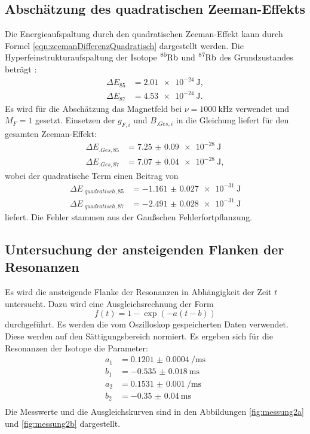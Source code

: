 \newpage
\subsection{Abschätzung des quadratischen Zeeman-Effekts}

Die Energieaufspaltung durch den quadratischen Zeeman-Effekt kann durch Formel \eqref{eqn:zeemanDifferenzQuadratisch} dargestellt werden. Die Hyperfeinstrukturaufspaltung der Isotope $\ce{^{85}Rb}$ und $\ce{^{87}Rb}$ des Grundzustandes beträgt \cite{V21}:
\begin{align*}
\Delta E_{85} &= \SI{2.01e-24}{\joule},\\
\Delta E_{87} &= \SI{4.53e-24}{\joule}\text{.}
\end{align*}
Es wird für die Abschätzung das Magnetfeld bei $\nu=\SI{1000}{\kilo\hertz}$ verwendet und $M_F=1$ gesetzt. Einsetzen der $g_{F,i}$ und $B_{.{Ges},i}$ in die Gleichung liefert für den gesamten Zeeman-Effekt:
\begin{align*}
\Delta E_{.{Ges},85} &= \SI{7.25(9)e-28}{\joule}\\
\Delta E_{.{Ges},87} &= \SI{7.07(4)e-28}{\joule},
\end{align*}
wobei der quadratische Term einen Beitrag von
\begin{align*}
\Delta E_{.{quadratisch},85} &= \SI{-1.161(27)e-31}{\joule}\\
\Delta E_{.{quadratisch},87} &= \SI{-2.491(28)e-31}{\joule}
\end{align*}
liefert. Die Fehler stammen aus der Gaußschen Fehlerfortpflanzung.

\subsection{Untersuchung der ansteigenden Flanken der Resonanzen}

Es wird die ansteigende Flanke der Resonanzen in Abhängigkeit der Zeit $t$ untersucht. Dazu wird eine Ausgleichsrechnung der Form
\[
f(t)=1-\exp(-a(t-b))
\]
durchgeführt. Es werden die vom Oszilloskop gespeicherten Daten verwendet. Diese werden auf den Sättigungsbereich normiert.
Es ergeben sich für die Resonanzen der Isotope die Parameter:
\begin{align*}
a_1 &= \SI{0.1201(4)}{\per\milli\second}\\
b_1 &= \SI{-0.535(18)}{\milli\second}\\
a_2 &= \SI{0.1531(10)}{\per\milli\second}\\
b_2 &= \SI{-0.35(4)}{\milli\second}\\
\end{align*}
Die Messwerte und die Ausgleichskurven sind in den Abbildungen \ref{fig:messung2a} und \ref{fig:messung2b} dargestellt. 

